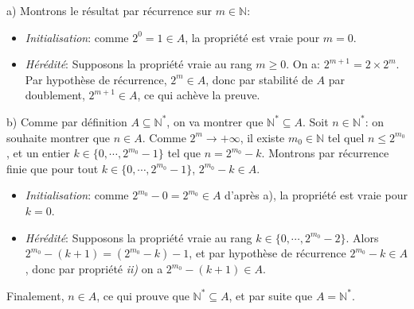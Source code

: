 a) Montrons le résultat par récurrence sur $m\in\mathbb{N}$:
\begin{itemize}
  \item \textit{Initialisation}: comme $2^0=1\in A$, la propriété est vraie pour $m=0$.
  \item \textit{Hérédité}: Supposons la propriété vraie au rang $m\geq 0$. On a: $2^{m+1}=2\times 2^m$. Par hypothèse de récurrence, $2^m \in A$, donc par stabilité de $A$ par doublement, $2^{m+1}\in A$, ce qui achève la preuve. \\ 
\end{itemize}
b) Comme par définition $A\subseteq \mathbb{N}^*$, on va montrer que $\mathbb{N}^* \subseteq A$. Soit $n\in\mathbb{N}^*$: on souhaite montrer que $n\in A$. Comme $2^m\to +\infty$, il existe $m_0\in\mathbb{N}$ tel quel $n\leq 2^{m_0}$, et un entier $k\in\{ 0,\cdots, 2^{m_0}-1 \}$ tel que $n=2^{m_0}-k$. Montrons par récurrence finie que pour tout $k\in\{ 0,\cdots, 2^{m_0}-1 \}$,  $2^{m_0}-k\in A$.
\begin{itemize}
  \item \textit{Initialisation}: comme $2^{m_0}-0=2^{m_0}\in A$ d’après a), la propriété est vraie pour $k=0$.
  \item \textit{Hérédité}: Supposons la propriété vraie au rang $k\in\{ 0,\cdots, 2^{m_0}-2 \}$. Alors $2^{m_0}-(k+1)=\left(2^{m_0}-k\right)-1$, et par hypothèse de récurrence $2^{m_0}-k\in A$, donc par propriété \textit{ii)} on a $2^{m_0}-(k+1)\in A$.
\end{itemize}
Finalement, $n\in A$, ce qui prouve que $\mathbb{N}^* \subseteq A$, et par suite que $A=\mathbb{N}^*$.
